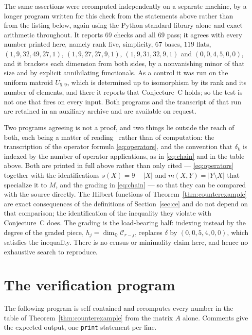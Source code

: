 \documentclass[11pt]{amsart}
\theoremstyle{remark}
\begin{document}
The same assertions were recomputed independently on a separate machine, by a
longer program written for this check from the statements above rather than
from the listing below, again using the Python standard library alone and
exact arithmetic throughout. It reports $69$ checks and all $69$ pass; it
agrees with every number printed here, namely rank five, simplicity, $67$
bases, $119$ flats, $(1,9,32,49,27,1)$, $(1,9,27,27,9,1)$, $(1,9,31,32,9,1)$
and $(0,0,4,5,0,0)$, and it brackets each dimension from both sides, by a
nonvanishing minor of that size and by explicit annihilating functionals. As a
control it was run on the uniform matroid $U_{5,9}$, which is determined up to
isomorphism by its rank and its number of elements, and there it reports that
Conjecture~C holds; so the test is not one that fires on every input. Both
programs and the transcript of that run are retained in an auxiliary archive
and are available on request.

Two programs agreeing is not a proof, and two things lie outside the reach of
both, each being a matter of reading~\cite{Sinclair} rather than of
computation: the transcription of the operator formula \eqref{eq:operators},
and the convention that $\delta_k$ is indexed by the number of operator
applications, as in \eqref{eq:chain} and in the table above. Both are printed
in full above rather than only cited --- \eqref{eq:operators} together with the
identifications $s(X)=9-|X|$ and $m(X,Y)=|Y\setminus X|$ that specialize it to
$M$, and the grading in \eqref{eq:chain} --- so that they can be compared with
the source directly. The Hilbert functions of
Theorem~\ref{thm:counterexample} are exact consequences of the definitions of
Section~\ref{sec:ce} and do not depend on that comparison; the identification
of the inequality they violate with Conjecture~C does. The grading is the
load-bearing half: indexing instead by the degree of the graded piece,
$h_j=\dim_{\mathbb Q}\mathcal C_{r-j}$, replaces $\delta$ by $(0,0,5,4,0,0)$,
which satisfies the inequality. There is no census or minimality claim here,
and hence no exhaustive search to reproduce.

\raggedbottom

\appendix

\section{The verification program}\label{app:code}

The following program is self-contained and recomputes every number in the
table of Theorem~\ref{thm:counterexample} from the matrix $A$ alone.
Comments give the expected output, one \texttt{print} statement per line.
\end{document}
